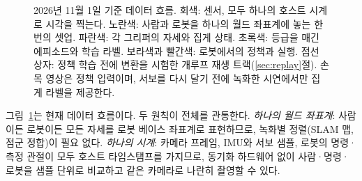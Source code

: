 \documentclass[conference,10pt]{IEEEtran}
\begin{document}
\begin{figure}[!t]
\caption{2026년 11월 1일 기준 데이터 흐름. 회색: 센서, 모두 하나의 호스트 시계로 시각을 찍는다. 노란색: 사람과 로봇을 하나의
월드 좌표계에 놓는 한 번의 셋업. 파란색: 각 그리퍼의 자세와 집게 상태. 초록색: 등급을 매긴 에피소드와 학습 라벨. 보라색과
빨간색: 로봇에서의 정책과 실행. 점선 상자: 정책 학습 전에 변환을 시험한 개루프 재생 트랙(\ref{sec:replay}절). 손목 영상은 정책
입력이며, 서보를 다시 달기 전에 녹화한 시연에서만 집게 라벨을 제공한다.}
\label{fig:pipe}
\end{figure}

그림~\ref{fig:pipe}는 현재 데이터 흐름이다. 두 원칙이 전체를 관통한다. \emph{하나의 월드 좌표계}: 사람이든 로봇이든 모든 자세를
로봇 베이스 좌표계로 표현하므로, 녹화별 정렬(SLAM 맵, 점군 정합)이 필요 없다. \emph{하나의 시계}: 카메라 프레임, IMU와 서보
샘플, 로봇의 명령·측정 관절이 모두 호스트 타임스탬프를 가지므로, 동기화 하드웨어 없이 사람·명령·로봇을 샘플 단위로 비교하고
같은 카메라로 나란히 촬영할 수 있다.

\end{document}
